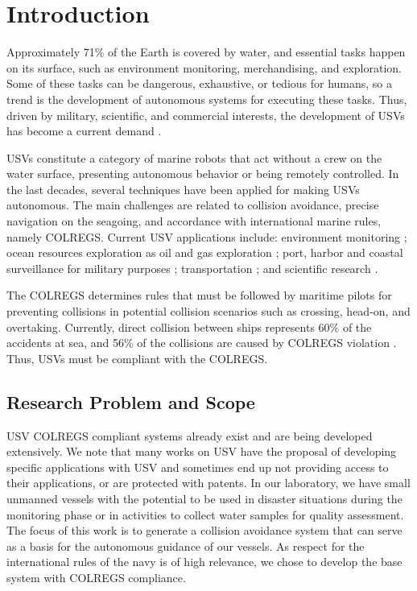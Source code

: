 \chapter{Introduction \label{chap:intro}}

    
    Approximately 71\% of the Earth is covered by water, and essential tasks happen on its surface, such as environment monitoring, merchandising, and exploration. Some of these tasks can be dangerous, exhaustive, or tedious for humans, so a trend is the development of autonomous systems for executing these tasks. Thus, driven by military, scientific, and commercial interests, the development of \acp{USV} has become a current demand \cite{Liu2016Unmanned}.
    
    \acp{USV} constitute a category of marine robots that act without a crew on the water surface, presenting autonomous behavior or being remotely controlled. In the last decades, several techniques have been applied for making \acp{USV} autonomous. The main challenges are related to collision avoidance, precise navigation on the seagoing, and accordance with international marine rules, namely \ac{COLREGS}.
    Current \ac{USV} applications include: environment monitoring \cite{Caccia2005Sampling}; ocean resources exploration as oil and gas exploration \cite{Pastore2010Improving}; port, harbor and coastal surveillance for military purposes \cite{Caccia2007unmanned, Pastore2010Improving, Svec2011aAutomated}; transportation \cite{Kiencke2005Impact}; and scientific research \cite{Yan2010Development}.
    
    The \acs{COLREGS} determines rules that must be followed by maritime pilots for preventing collisions in potential collision scenarios such as crossing, head-on, and overtaking. Currently, direct collision between ships represents 60\% of the accidents at sea, and 56\% of the collisions are caused by \acs{COLREGS} violation \cite{Liu2016Unmanned, Campbell2012Review_COLREGs}. Thus, \acp{USV} must be compliant with the \ac{COLREGS}.
    
    \section{Research Problem and Scope}
    
    \ac{USV} \ac{COLREGS} compliant systems already exist and are being developed extensively. We note that many works on \ac{USV} have the proposal of developing specific applications with \ac{USV} and sometimes end up not providing access to their applications, or are protected with patents. In our laboratory, we have small unmanned vessels with the potential to be used in disaster situations during the monitoring phase or in activities to collect water samples for quality assessment. The focus of this work is to generate a collision avoidance system that can serve as a basis for the autonomous guidance of our vessels. As respect for the international rules of the navy is of high relevance, we chose to develop the base system with \ac{COLREGS} compliance.
    
